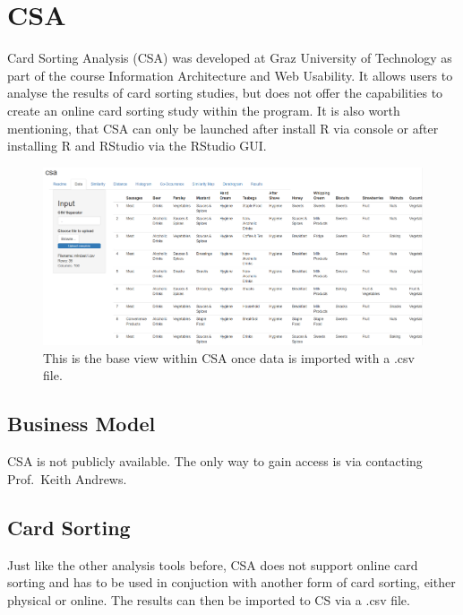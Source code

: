 \chapter{CSA}

\label{chap:CSA}

Card Sorting Analysis (CSA) was developed at Graz University of
Technology as part of the course Information Architecture and Web
Usability. It allows users to analyse the results of card sorting
studies, but does not offer the capabilities to create an online card
sorting study within the program. It is also worth mentioning, that
CSA can only be launched after install R via console or after
installing R and RStudio via the RStudio GUI.


\begin{figure}[tp] 
\centering
\includegraphics[keepaspectratio,width=\linewidth,height=\halfh]{images/csa-data.png}
\caption[CSA Application] { This is the base view within CSA
once data is imported with a .csv file.
 }
\label{fig:CSA1}
\end{figure}



\section{Business Model}

CSA is not publicly available. The only way to gain access is via contacting 
Prof.\ Keith Andrews.


\section{Card Sorting}

Just like the other analysis tools before, CSA does not support online card 
sorting and has to be used in conjuction with another form of card sorting, 
either physical or online. The results can then be imported to CS via a .csv 
file.


